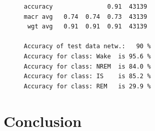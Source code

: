 \documentclass{article}
\begin{document}
\begin{figure}[H]
\begin{tcolorbox}[colframe=black, colback=white, sharp corners, boxrule=0.2mm, width=\textwidth]
\begin{minipage}[t]{0.48\textwidth}
{\begin{verbatim}
accuracy               0.91  43139
macr avg   0.74  0.74  0.73  43139
 wgt avg   0.91  0.91  0.91  43139

Accuracy of test data netw.:   90 %
Accuracy for class: Wake  is 95.6 %
Accuracy for class: NREM  is 84.0 %
Accuracy for class: IS    is 85.2 %
Accuracy for class: REM   is 29.9 %
            \end{verbatim}}
        \end{minipage}
    \end{tcolorbox}
\end{figure}

\begin{multicols}{2}
\end{multicols}

\section*{Conclusion}
\end{document}

